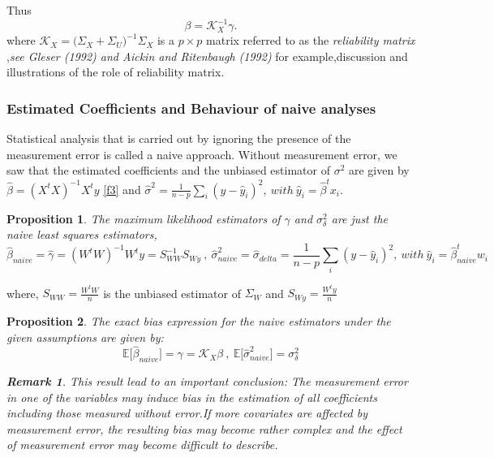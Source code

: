 \documentclass[12pt]{report}
\newtheorem {proposition}{Proposition}[section]  %
\newtheorem{remarque}{Remark}[section]
\begin{document}
Thus
\begin{equation}
	\beta=\mathcal{K}_{X}^{-1}\gamma.
	\label{f50}
\end{equation}
where $\mathcal{K}_{X}=\big(\Sigma_{X}+\Sigma_{U}\big)^{-1}\Sigma_{X}$ is a $p\times p$ matrix  referred to as the \textit{reliability matrix} ,\textit{see Gleser (1992) \cite{nref4}  and Aickin and Ritenbaugh (1992)} for example,discussion and illustrations of the role of reliability matrix.

	\subsubsection{Estimated Coefficients and Behaviour of naive analyses}


Statistical analysis that is carried out by ignoring the presence of the measurement error is called a naive approach.
Without measurement error, we saw that the estimated coefficients and the unbiased estimator of $\sigma^{2}$ are given by $\hat{\beta}=(X^{t}X)^{-1}X^{t}y$ \eqref{f3}  and $\hat{\sigma}^{2}=\frac{1}{n-p}\sum_{i}(y-\hat{y}_{i})^{2},\ with\ \hat{y}_{i}=\hat{\beta}^{t}x_{i}$.
\begin{proposition}
	The maximum likelihood estimators of $\gamma$ and $\sigma_{\delta}^{2}$ are just the naive least squares estimators,
	\begin{equation}
		\hat{\beta}_{naive}=\hat{\gamma}=(W^{t}W)^{-1}W^{t}y=S_{WW}^{-1}S_{Wy}\ ,\ \hat{\sigma}^{2}_{naive}=\hat{\sigma}_{delta}=\frac{1}{n-p}\sum_{i}(y-\hat{y}_{i})^{2},\ with\ \hat{y}_{i}=\hat{\beta}^{t}_{naive}w_{i}
		\label{f51}
	\end{equation}
\end{proposition}
where, $S_{WW}=\frac{W^{t}W}{n}$ is the unbiased estimator of $\Sigma_{W}$ and $S_{Wy}=\frac{W^{t}y}{n}$
\begin{proposition}
	The exact bias expression for the naive estimators under the given assumptions are given by:
	\begin{equation}
		\mathbb{E}\big[\hat{\beta}_{naive}\big]=\gamma=\mathcal{K}_{X}\beta \ , \ \mathbb{E}\big[\hat{\sigma}_{naive}^{2}\big]=\sigma^{2}_{\delta }
		\label{f52}
	\end{equation}
	\begin{remarque}
		This result lead to an important conclusion: The measurement error in one of the variables may induce bias in the estimation of all coefficients including those measured without error.If more covariates are affected by measurement error, the resulting bias may become rather complex and the effect of measurement error may become difficult to describe.
	\end{remarque}
\end{proposition}
\end{document}

